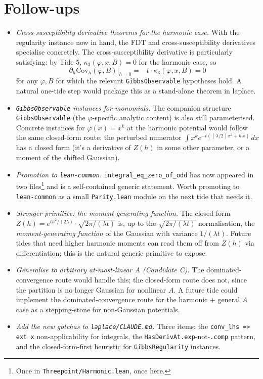\documentclass[11pt]{article}
\begin{document}
\section{Follow-ups}

\begin{itemize}
\item \emph{Cross-susceptibility derivative theorems for the
harmonic case.} With the regularity instance now in hand, the FDT
and cross-susceptibility derivatives specialise concretely. The
cross-susceptibility derivative is particularly satisfying: by Tide
5, $\kappa_3(\varphi, x, B) = 0$ for the harmonic case, so
\[
  \partial_h \mathrm{Cov}_h(\varphi, B)\big|_{h=0}
    = -t \cdot \kappa_3(\varphi, x, B) = 0
\]
for any $\varphi, B$ for which the relevant
\texttt{GibbsObservable} hypotheses hold. A natural one-tide step
would package this as a stand-alone theorem in laplace.

\item \emph{\texttt{GibbsObservable} instances for monomials.} The
companion structure \texttt{GibbsObservable} (the $\varphi$-specific
analytic content) is also still parameterised. Concrete instances
for $\varphi(x) = x^k$ at the harmonic potential would follow the
same closed-form route: the perturbed numerator
$\int x^k e^{-t((\lambda/2)x^2 + h\,x)}\,dx$ has a closed form (it's
a derivative of $Z(h)$ in some other parameter, or a moment of the
shifted Gaussian).

\item \emph{Promotion to \texttt{lean-common}.}
\texttt{integral\_eq\_zero\_of\_odd} has now appeared in two
files\footnote{Once in \texttt{Threepoint/Harmonic.lean}, once
here.} and is a self-contained generic statement. Worth promoting to
\texttt{lean-common} as a small \texttt{Parity.lean} module on the
next tide that needs it.

\item \emph{Stronger primitive: the moment-generating function.} The
closed form $Z(h) = e^{t h^2/(2\lambda)} \cdot \sqrt{2\pi/(\lambda
t)}$ is, up to the $\sqrt{2\pi/(\lambda t)}$ normalisation, the
\emph{moment-generating function} of the Gaussian with variance
$1/(\lambda t)$. Future tides that need higher harmonic moments can
read them off from $Z(h)$ via differentiation; this is the natural
generic primitive to expose.

\item \emph{Generalise to arbitrary at-most-linear $A$ (Candidate
C).} The dominated-convergence route would handle this; the
closed-form route does not, since the partition is no longer
Gaussian for nonlinear $A$. A future tide could implement the
dominated-convergence route for the harmonic + general $A$ case as
a stepping-stone for non-Gaussian potentials.

\item \emph{Add the new gotchas to \texttt{laplace/CLAUDE.md}.}
Three items: the \texttt{conv\_lhs => ext x} non-applicability for
integrals, the \texttt{HasDerivAt.exp}-not-\texttt{.comp} pattern,
and the closed-form-first heuristic for \texttt{GibbsRegularity}
instances.
\end{itemize}
\end{document}
